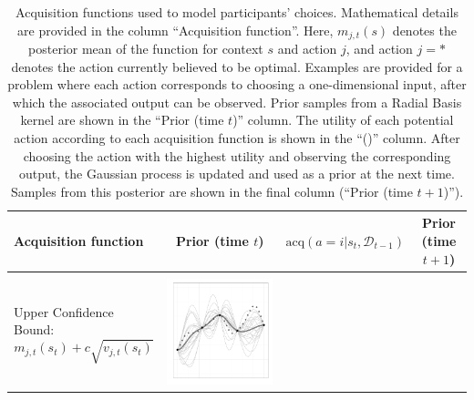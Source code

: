 \documentclass[a4paper,natbib]{apa6}
\begin{document}
\begin{table}[h!]
\tiny
\caption{Acquisition functions used to model participants' choices. Mathematical details are provided in the column ``Acquisition function''. Here, $m_{j,t}(s)$ denotes the posterior mean of the function for context $s$ and action $j$, and action $j=*$ denotes the action currently believed to be optimal. Examples are provided for a problem where each action corresponds to choosing a one-dimensional input, after which the associated output can be observed. Prior samples from a Radial Basis kernel are shown in the ``Prior (time $t$)'' column. The utility of each potential action according to each acquisition function is shown in the ``()'' column. After choosing the action with the highest utility and observing the corresponding output, the Gaussian process is updated and used as a prior at the next time. Samples from this posterior are shown in the final column (``Prior (time $t + 1$)'').}
\label{tab:acqs}
\footnotesize
\centering
 \begin{tabular}{lccc}
\bf{Acquisition function} & \bf{Prior (time $t$)} & \bf{$\text{acq}(a = i|s_t,\mathcal{D}_{t-1})$}&\bf{Prior (time $t+1$)}\\
\hline\\
\parbox[b]{5cm}{Upper Confidence Bound: $$m_{j,t}(s_t)+c \sqrt{v_{j,t}(s_t)}$$\\} & 
\includegraphics[scale=0.2]{figure9.pdf} &  

\end{tabular}
\end{table}
\end{document}
